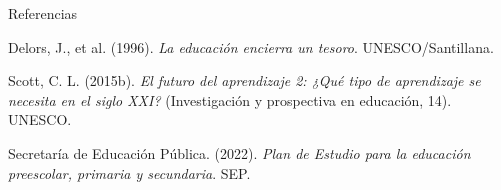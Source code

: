 \documentclass[
	spanish,
	aspectratio=1610,
	xcolor={dvipsnames,table}
]{beamer}
\begin{document}
\begin{frame}{Referencias}
\fontsize{9}{11}\selectfont\raggedright 
{\setlength{\parskip}{6pt}
\par\hangindent=1.27cm  Delors, J., et al. (1996). \textit{La educación encierra un tesoro}. UNESCO/Santillana.
\par\hangindent=1.27cm  Scott, C. L. (2015b). \textit{El futuro del aprendizaje 2: ¿Qué tipo de aprendizaje se necesita en el siglo XXI?} (Investigación y prospectiva en educación, 14). UNESCO.
\par\hangindent=1.27cm  Secretaría de Educación Pública. (2022). \textit{Plan de Estudio para la educación preescolar, primaria y secundaria}. SEP.
}


\end{frame}
\end{document}

